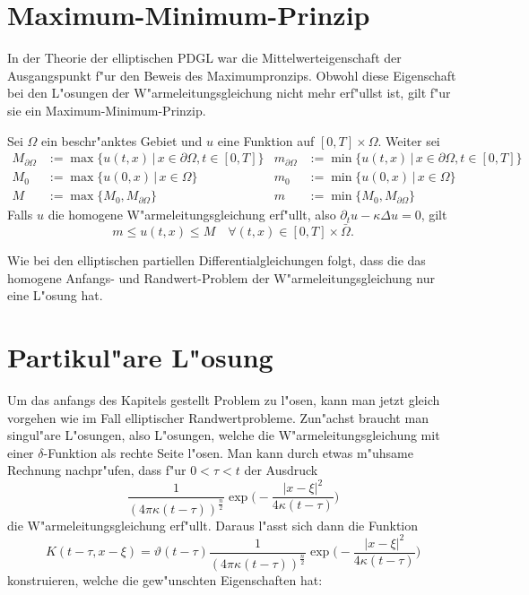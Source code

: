 \section{Maximum-Minimum-Prinzip}
In der Theorie der elliptischen PDGL war die Mittelwerteigenschaft
der Ausgangspunkt f"ur den Beweis des Maximumpronzips. Obwohl
diese Eigenschaft bei den 
L"osungen der W"armeleitungsgleichung nicht mehr erf"ullst ist,
gilt f"ur sie ein Maximum-Minimum-Prinzip.
\begin{satz}
Sei $\Omega$ ein beschr"anktes Gebiet und
$u$ eine Funktion auf $[0,T]\times\Omega$.
Weiter sei
\begin{align*}
M_{\partial \Omega}&:=\max\{u(t,x)\,|\,x\in\partial\Omega, t\in[0,T]\}
&
m_{\partial \Omega}&:=\min\{u(t,x)\,|\,x\in\partial\Omega, t\in[0,T]\}
\\
M_0&:=
\max\{u(0,x)\,|\,x\in\Omega\}
&
m_0&:=
\min\{u(0,x)\,|\,x\in\Omega\}
\\
M&:=\max\{M_0,M_{\partial\Omega}\}
&
m&:=\min\{M_0,M_{\partial\Omega}\}
\end{align*}
Falls $u$ die homogene
W"armeleitungsgleichung erf"ullt, also $\partial_tu-\kappa\Delta u=0$,
gilt
$$m\le u(t,x)\le M\quad\forall(t,x)\in[0,T]\times\bar\Omega.$$
\end{satz}
Wie bei den elliptischen partiellen Differentialgleichungen folgt, dass
die das homogene Anfangs- und Randwert-Problem der W"armeleitungsgleichung
nur eine L"osung hat.

\section{Partikul"are L"osung}
Um das anfangs des Kapitels gestellt Problem zu l"osen, kann man jetzt
gleich vorgehen wie im Fall elliptischer Randwertprobleme. Zun"achst
braucht man singul"are L"osungen, also L"osungen, welche die
W"armeleitungsgleichung mit einer $\delta$-Funktion als rechte Seite
l"osen.
Man kann durch etwas m"uhsame Rechnung nachpr"ufen, dass f"ur $0<\tau<t$
der Ausdruck
$$
\frac1{(4\pi\kappa(t-\tau))^{\frac{n}2}}
\exp\biggl(-\frac{|x-\xi|^2}{4\kappa(t-\tau)}\biggr)
$$
die W"armeleitungsgleichung erf"ullt. Daraus l"asst sich
dann die Funktion
\begin{equation}
K(t-\tau, x-\xi)
=
\vartheta(t-\tau)
\frac1{(4\pi\kappa(t-\tau))^{\frac{n}2}}
\exp\biggl(-\frac{|x-\xi|^2}{4\kappa(t-\tau)}\biggr)
\label{parabolischsingulaer}
\end{equation}
konstruieren, welche die gew"unschten Eigenschaften hat:

